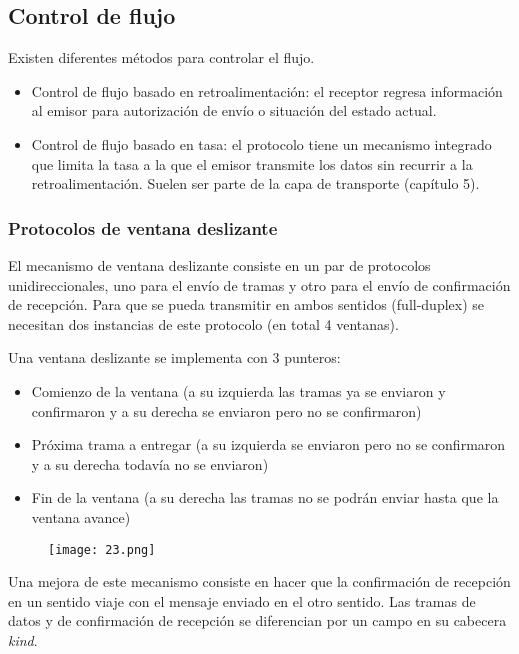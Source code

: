 \documentclass{book}
\begin{document}
	\subsection{Control de flujo}
	Existen diferentes métodos para controlar el flujo.
	
	\begin{itemize}
		\item Control de flujo basado en retroalimentación: el receptor regresa información al emisor para autorización de envío o situación del estado actual.
		\item Control de flujo basado en tasa: el protocolo tiene un mecanismo integrado que limita la tasa a la que el emisor transmite los datos sin recurrir a la retroalimentación. Suelen ser parte de la capa de transporte (capítulo 5).
	\end{itemize}
	
	\subsubsection{Protocolos de ventana deslizante}
	El mecanismo de ventana deslizante consiste en un par de protocolos unidireccionales, uno para el envío de tramas y otro para el envío de confirmación de recepción. Para que se pueda transmitir en ambos sentidos (full-duplex) se necesitan dos instancias de este protocolo (en total 4 ventanas).
	
	\vspace{3mm}
	Una ventana deslizante se implementa con 3 punteros:
	\begin{itemize}
		\item Comienzo de la ventana (a su izquierda las tramas ya se enviaron y confirmaron y a su derecha se enviaron pero no se confirmaron)
		\item Próxima trama a entregar (a su izquierda se enviaron pero no se confirmaron y a su derecha todavía no se enviaron)
		\item Fin de la ventana (a su derecha las tramas no se podrán enviar hasta que la ventana avance)
	\end{itemize}
	
	\begin{figure}[H]
		\centering
		\texttt{[image: 23.png]}
	\end{figure}
	
	Una mejora de este mecanismo consiste en hacer que la confirmación de recepción en un sentido viaje con el mensaje enviado en el otro sentido. Las tramas de datos y de confirmación de recepción se diferencian por un campo en su cabecera \textit{kind}.
	
\end{document}
